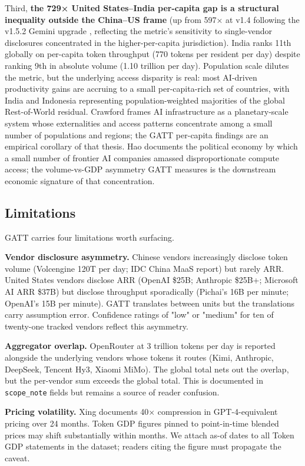\documentclass[11pt,a4paper]{article}
\begin{document}
Third, \textbf{the 729× United States–India per-capita gap is a structural inequality outside the China–US frame} (up from 597× at v1.4 following the v1.5.2 Gemini upgrade \cite{pichai2026io}, reflecting the metric's sensitivity to single-vendor disclosures concentrated in the higher-per-capita jurisdiction). India ranks 11th globally on per-capita token throughput (770 tokens per resident per day) despite ranking 9th in absolute volume (1.10 trillion per day). Population scale dilutes the metric, but the underlying access disparity is real: most AI-driven productivity gains are accruing to a small per-capita-rich set of countries, with India and Indonesia representing population-weighted majorities of the global Rest-of-World residual. Crawford \cite{crawford2021atlas} frames AI infrastructure as a planetary-scale system whose externalities and access patterns concentrate among a small number of populations and regions; the GATT per-capita findings are an empirical corollary of that thesis. Hao \cite{hao2025empire} documents the political economy by which a small number of frontier AI companies amassed disproportionate compute access; the volume-vs-GDP asymmetry GATT measures is the downstream economic signature of that concentration.

\subsection{Limitations}

GATT carries four limitations worth surfacing.

\textbf{Vendor disclosure asymmetry.} Chinese vendors increasingly disclose token volume (Volcengine 120T per day; IDC China MaaS report) but rarely ARR. United States vendors disclose ARR (OpenAI \$25B; Anthropic \$25B+; Microsoft AI ARR \$37B) but disclose throughput sporadically (Pichai's 16B per minute; OpenAI's 15B per minute). GATT translates between units but the translations carry assumption error. Confidence ratings of "low" or "medium" for ten of twenty-one tracked vendors reflect this asymmetry.

\textbf{Aggregator overlap.} OpenRouter at 3 trillion tokens per day is reported alongside the underlying vendors whose tokens it routes (Kimi, Anthropic, DeepSeek, Tencent Hy3, Xiaomi MiMo). The global total nets out the overlap, but the per-vendor sum exceeds the global total. This is documented in \texttt{scope\_note} fields but remains a source of reader confusion.

\textbf{Pricing volatility.} Xing \cite{xing2026token} documents 40× compression in GPT-4-equivalent pricing over 24 months. Token GDP figures pinned to point-in-time blended prices may shift substantially within months. We attach as-of dates to all Token GDP statements in the dataset; readers citing the figure must propagate the caveat.
\end{document}

